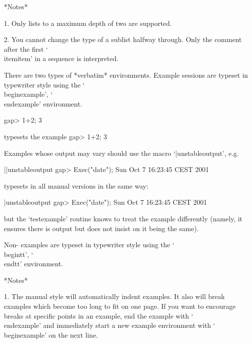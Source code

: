 *Notes*

\beginlist%
\item{1.} Only lists to a maximum depth of two are supported.

\item{2.} You cannot change the type of a sublist halfway through. Only
the comment after the first `\\itemitem' in a sequence is interpreted.

\endlist

\indextt{\\begintt}\indextt{\\endtt}
\indextt{\\beginexample}\indextt{\\endexample}
There are two types of *verbatim* environments.
Example {\GAP} sessions are typeset in typewriter style
using the `\\beginexample', `\\endexample' environment.

\begintt
\beginexample
gap> 1+2;
3
\endexample
\endtt

typesets the example
\beginexample
gap> 1+2;
3
\endexample

Examples whose output may vary should use the macro `|unstableoutput', e.g.

\begintt
\beginexample||unstableoutput
gap> Exec("date");
Sun Oct  7 16:23:45 CEST 2001
\endexample
\endtt

typesets in all manual versions in the same way:

\beginexample|unstableoutput
gap> Exec("date");
Sun Oct  7 16:23:45 CEST 2001
\endexample

but the `testexample' routine knows to treat the example differently
(namely, it ensures there is output but does not insist on it being
the same).

Non-{\GAP} examples are typeset in typewriter style
using the `\\begintt', `\\endtt' environment.

*Notes*

\beginlist%

\item{1.}
The manual style will automatically indent examples. It also will break
examples which become too long to fit on one page. If you want to encourage
breaks at specific points in an example, end the example with `\\endexample'
and immediately start a new example environment with `\\beginexample' on
the next line.

